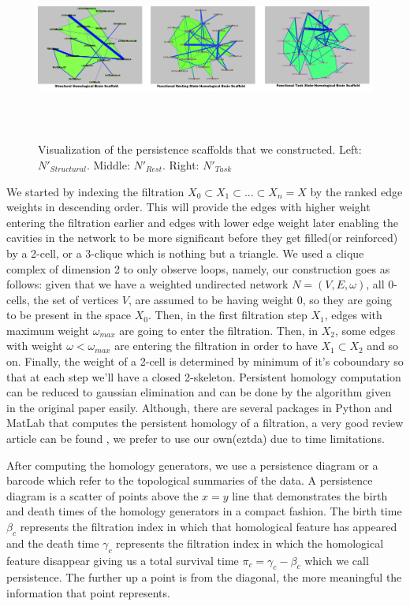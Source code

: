 \documentclass[9pt,twocolumn,twoside,lineno]{pnas-new}
\begin{document}
\begin{figure}%
\centering
\includegraphics[width=18cm,height=6cm]{strucscaf.png}
\caption{Visualization of the persistence scaffolds that we constructed. Left: $N'_{Structural}$. Middle: $N'_{Rest}$. Right: $N'_{Task}$  }
\end{figure}


We started by indexing the filtration $X_{0}\subset X_{1}\subset ...\subset X_{n}=X$ by the ranked edge weights in descending order. This will provide the edges with higher weight entering the filtration earlier and edges with lower edge weight later enabling the cavities in the network to be more significant before they get filled(or reinforced) by a 2-cell, or a 3-clique which is nothing but a triangle. We used a clique complex of dimension 2 to only observe loops, namely, our construction goes as follows: given that we have a weighted undirected network $N=(V,E,\omega)$, all 0-cells, the set of vertices $V$, are assumed to be having weight $0$, so they are going to be present in the space $X_{0}$. Then, in the first filtration step $X_{1}$, edges with maximum weight $\omega_{max}$ are going to enter the filtration. Then, in $X_{2}$, some edges with weight $\omega<\omega_{max}$ are entering the filtration in order to have $X_{1}\subset X_{2}$ and so on. Finally, the weight of a 2-cell is determined by minimum of it's coboundary so that at each step we'll have a closed 2-skeleton. Persistent homology computation can be reduced to gaussian elimination and can be done by the algorithm given in the original paper\cite{zomorodian} easily. Although, there are several packages in Python and MatLab that computes the persistent homology of a filtration, a very good review article can be found \cite{roadmap}, we prefer to use our own(eztda) due to time limitations.

After computing the homology generators, we use a persistence diagram or a barcode \cite{barcode} which refer to the topological summaries of the data. A persistence diagram is a scatter of points above the $x=y$ line that demonstrates the birth and death times of the homology generators in a compact fashion. The birth time $\beta_{c}$ represents the filtration index in which that homological feature has appeared and the death time $\gamma_{c}$ represents the filtration index in which the homological feature disappear giving us a total survival time $\pi_{c}=\gamma_{c}-\beta_{c}$ which we call persistence.  The further up a point is from the diagonal, the more meaningful the information that point represents.
\end{document}
